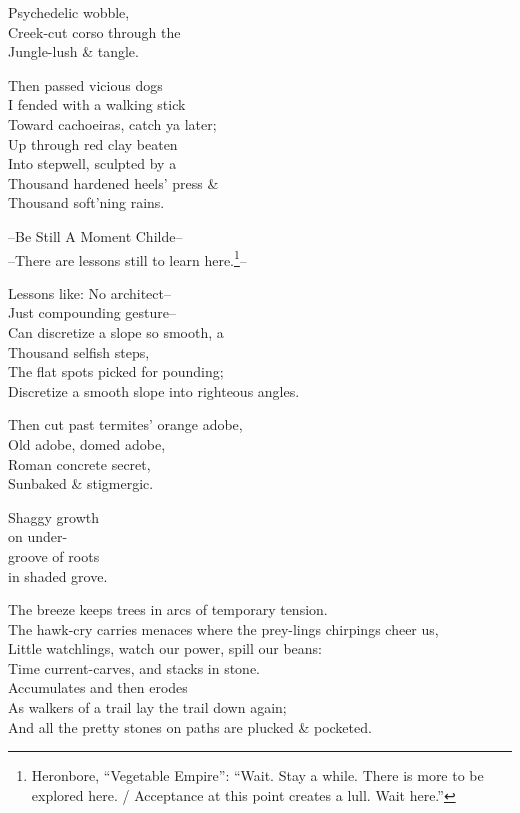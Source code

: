 Psychedelic wobble, \\
Creek-cut corso through the \\
Jungle-lush \& tangle.

Then passed vicious dogs \\
I fended with a walking stick \\
Toward cachoeiras, catch ya later; \\
Up through red clay beaten \\
Into stepwell, sculpted by a \\
Thousand hardened heels' press \& \\
Thousand soft'ning rains.

\secdiv

--Be Still A Moment Childe-- \\
--There are lessons still to learn here.\footnote{Heronbore, ``Vegetable Empire'': ``Wait. Stay a while. There is more to be explored here. / Acceptance at this point creates a lull. Wait here.''}--

Lessons like: No architect--\\
Just compounding gesture-- \\
Can discretize a slope so smooth, a \\
Thousand selfish steps, \\
The flat spots picked for pounding; \\
Discretize a smooth slope into righteous angles.

Then cut past termites' orange adobe, \\
Old adobe, domed adobe, \\
Roman concrete secret, \\
Sunbaked \& stigmergic.

Shaggy growth \\
on under- \\
groove of roots \\
in shaded grove.

The breeze keeps trees in arcs of temporary tension. \\
The hawk-cry carries menaces where the prey-lings chirpings cheer us, \\
Little watchlings, watch our power, spill our beans: \\
Time current-carves, and stacks in stone. \\
Accumulates and then erodes \\
As walkers of a trail lay the trail down again; \\
And all the pretty stones on paths are plucked \& pocketed.

